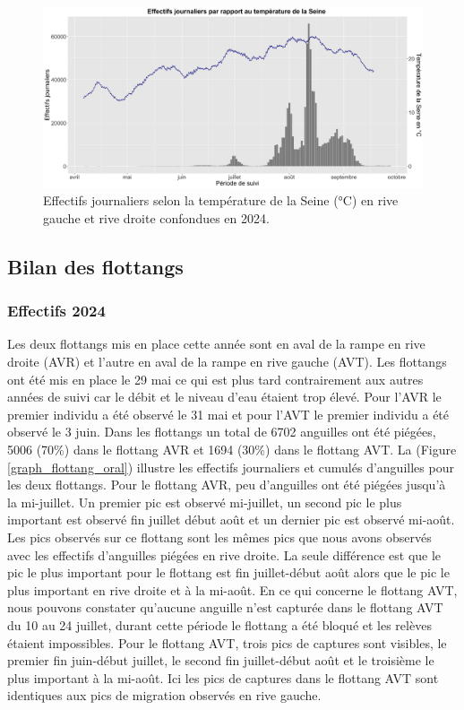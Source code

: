 \documentclass[11pt,titlepage,twoside]{article}\usepackage[]{graphicx}\usepackage[table]{xcolor}
\begin{document}
\begin{figure}[htpb]
\centering
\includegraphics[width=\textwidth]{graph_temp_eau_oral.png}
\caption{Effectifs journaliers selon la température de la Seine (°C) en rive gauche et rive droite confondues en 2024.}
\label{graph_temp_eau_oral}
\end{figure} 

\subsection{Bilan des flottangs }

\subsubsection{Effectifs 2024}


Les deux flottangs mis en place cette année sont en aval de la rampe en rive droite (AVR) et l’autre en aval de la rampe en rive gauche (AVT). Les flottangs ont été mis en place le 29 mai ce qui est plus tard contrairement aux autres années de suivi car le débit et le niveau d’eau étaient trop élevé. Pour l’AVR le premier individu a été observé le 31 mai et pour l’AVT le premier individu a été observé le 3 juin. Dans les flottangs un total de 6702 anguilles ont été piégées, 5006 (70\%) dans le flottang AVR et 1694 (30\%) dans le flottang AVT. La (Figure \ref{graph_flottang_oral}) illustre les effectifs journaliers et cumulés d'anguilles pour les deux flottangs. Pour le flottang AVR, peu d’anguilles ont été piégées jusqu’à la mi-juillet. Un premier pic est observé mi-juillet, un second pic le plus important est observé fin juillet début août et un dernier pic est observé mi-août. Les pics observés sur ce flottang sont les mêmes pics que nous avons observés avec les effectifs d’anguilles piégées en rive droite. La seule différence est que le pic le plus important pour le flottang est fin juillet-début août alors que le pic le plus important en rive droite et à la mi-août. En ce qui concerne le flottang AVT, nous pouvons constater qu’aucune anguille n’est capturée dans le flottang AVT du 10 au 24 juillet, durant cette période le flottang a été bloqué et les relèves étaient impossibles. Pour le flottang AVT, trois pics de captures sont visibles, le premier fin juin-début juillet, le second fin juillet-début août et le troisième le plus important à la mi-août. Ici les pics de captures dans le flottang AVT sont identiques aux pics de migration observés en rive gauche.
\end{document}
